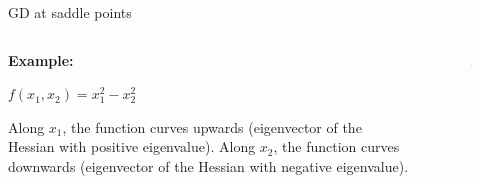 

\begin{vbframe}{GD at saddle points}
	
	\begin{columns}
		\begin{column}{0.48\textwidth}
			\textbf{Example: }
			\begin{center}
				$f(x_1, x_2) = x_1^2 - x_2^2$
			\end{center}
			Along $x_1$, the function curves upwards (eigenvector of the Hessian with positive eigenvalue). Along $x_2$, the function curves downwards (eigenvector of the Hessian with negative eigenvalue).
			
		\end{column}
		\begin{column}{0.48\textwidth}
			\begin{figure}
				\centering
				\includegraphics[width=4cm]{figure_man/saddlepoint.png}
			\end{figure} 
		\end{column}	
	\end{columns}
	
\end{vbframe}


